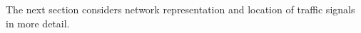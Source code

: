 The next section considers network representation and location of traffic signals in more detail. 

%
